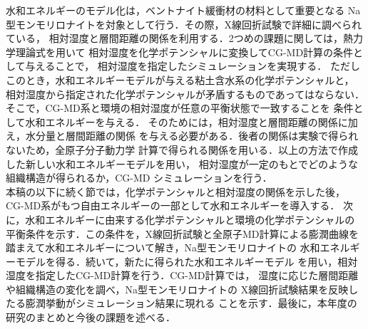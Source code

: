 水和エネルギーのモデル化は，ベントナイト緩衝材の材料として重要となる
Na型モンモリロナイトを対象として行う．その際，X線回折試験で詳細に調べられている，
相対湿度と層間距離の関係を利用する．2つめの課題に関しては，熱力学理論式を用いて
相対湿度を化学ポテンシャルに変換してCG-MD計算の条件として与えることで，
相対湿度を指定したシミュレーションを実現する．
ただしこのとき，水和エネルギーモデルが与える粘土含水系の化学ポテンシャルと，
相対湿度から指定された化学ポテンシャルが矛盾するものであってはならない．
そこで，CG-MD系と環境の相対湿度が任意の平衡状態で一致することを
条件として水和エネルギーを与える．
そのためには，相対湿度と層間距離の関係に加え，水分量と層間距離の関係
を与える必要がある．後者の関係は実験で得られないため，全原子分子動力学
計算で得られる関係を用いる．以上の方法で作成した新しい水和エネルギーモデルを用い，
相対湿度が一定のもとでどのような組織構造が得られるか，CG-MD
シミュレーションを行う．\\
\hspace{\parindent}
本稿の以下に続く節では，化学ポテンシャルと相対湿度の関係を示した後，
CG-MD系がもつ自由エネルギーの一部として水和エネルギーを導入する．
次に，水和エネルギーに由来する化学ポテンシャルと環境の化学ポテンシャルの
平衡条件を示す．この条件を，X線回折試験と全原子MD計算による膨潤曲線を
踏まえて水和エネルギーについて解き，Na型モンモリロナイトの
水和エネルギーモデルを得る．続いて，新たに得られた水和エネルギーモデル
を用い，相対湿度を指定したCG-MD計算を行う．CG-MD計算では，
湿度に応じた層間距離や組織構造の変化を調べ，Na型モンモリロナイトの
X線回折試験結果を反映したる膨潤挙動がシミュレーション結果に現れる
ことを示す．最後に，本年度の研究のまとめと今後の課題を述べる．
